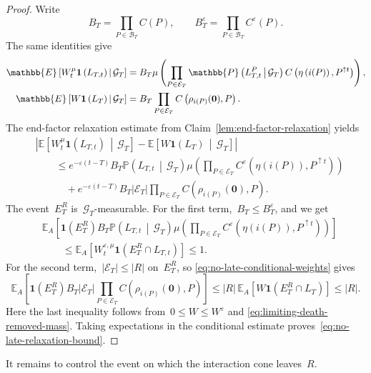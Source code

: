 \documentclass[EJP,preprint,NODS,nobera]{ejpecp}
\newcommand{\pP}{\mathbb{P}}
\newcommand{\E}{\mathbb{E}}
\newcommand{\CE}[2]{\E\Cb{#1\,\middle|\,#2}}
\newcommand{\CP}[2]{\pP\bb{#1\,\middle|\,#2}}
\newcommand{\bb}[1]{\left(#1\right)}
\newcommand{\Cb}[1]{\left[#1\right]}
\newcommand{\abs}[1]{\left|#1\right|}
\newcommand{\ind}{\mathbf{1}}
\newcommand{\mb}[1]{\mathbf{#1}}
\begin{document}
\begin{proof}
Write
\begin{equation*}
B_T
=
\prod_{P\in\mathcal B_T}C(P),
\qquad
B_T^\varepsilon
=
\prod_{P\in\mathcal B_T}C^\varepsilon(P).
\end{equation*}
The same identities give
\begin{align}
\label{eq:no-late-conditional-weights}
\CE{W_t^\mu\ind\bb{L_{T,t}}}{\mathcal G_T}
&=
B_T
\mu\bb{
 \prod_{P\in\mathcal E_T}
 \CP{L_{T,t}^P}{\mathcal G_T}
 C\bb{\eta\bb{i(P)},P^{\uparrow t}}
},
\notag\\
\CE{W\ind\bb{L_T}}{\mathcal G_T}
&=
B_T
\prod_{P\in\mathcal E_T}
C\bb{\rho_{i(P)}(\mb 0),P}.
\end{align}
The end-factor relaxation estimate from
Claim~\ref{lem:end-factor-relaxation} yields
\begin{align*}
&\abs{
\CE{W_t^\mu\ind\bb{L_{T,t}}}{\mathcal G_T}
-
\CE{W\ind\bb{L_T}}{\mathcal G_T}
}
\\
&\qquad\leq
e^{-\varepsilon(t-T)}
B_T
\CP{L_{T,t}}{\mathcal G_T}
\mu\bb{
 \prod_{P\in\mathcal E_T}
 C^\varepsilon\bb{\eta\bb{i(P)},P^{\uparrow t}}
}
\\
&\qquad\quad+
e^{-\varepsilon(t-T)}
B_T\abs{\mathcal E_T}
\prod_{P\in\mathcal E_T}
C\bb{\rho_{i(P)}(\mb 0),P}.
\end{align*}
The event~$E_T^R$ is~$\mathcal G_T$-measurable. For the first term,~$B_T\leq B_T^\varepsilon$, and we get
\begin{align*}
&\E_A\Cb{
 \ind\bb{E_T^R}
 B_T
 \CP{L_{T,t}}{\mathcal G_T}
 \mu\bb{
  \prod_{P\in\mathcal E_T}
  C^\varepsilon\bb{\eta\bb{i(P)},P^{\uparrow t}}
 }
}
\\
&\qquad\leq
\E_A\Cb{
 W_t^{\varepsilon,\mu}
 \ind\bb{E_T^R\cap L_{T,t}}
}
\leq1.
\end{align*}
For the second term,~$\abs{\mathcal E_T}\leq\abs R$ on~$E_T^R$, so
\eqref{eq:no-late-conditional-weights} gives
\begin{equation*}
\E_A\Cb{
 \ind\bb{E_T^R}
 B_T\abs{\mathcal E_T}
 \prod_{P\in\mathcal E_T}
 C\bb{\rho_{i(P)}(\mb 0),P}
}\leq
\abs R\,
\E_A\Cb{
 W\ind\bb{E_T^R\cap L_T}
}
\leq
\abs R.
\end{equation*}
Here the last inequality follows from~$0\leq W\leq W^\varepsilon$ and
\eqref{eq:limiting-death-removed-mass}. Taking expectations in the conditional
estimate proves~\eqref{eq:no-late-relaxation-bound}.
\end{proof}

It remains to control the event on which the interaction cone leaves~$R$.
\end{document}
